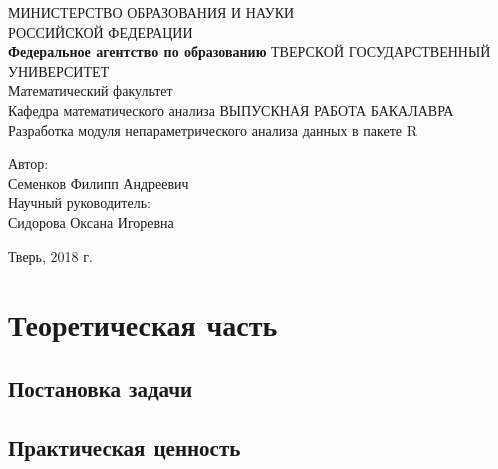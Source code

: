 \documentclass[14pt,a4paper]{scrartcl}
\begin{document}
    \begin{titlepage}
        \begin{center}
            \large
            МИНИСТЕРСТВО ОБРАЗОВАНИЯ И НАУКИ\\
            РОССИЙСКОЙ ФЕДЕРАЦИИ\\
            \textbf{Федеральное агентство по образованию}
            \vspace{0.5cm}
            ТВЕРСКОЙ ГОСУДАРСТВЕННЫЙ УНИВЕРСИТЕТ\\
            \vspace{0.25cm}
            Математический факультет\\
            Кафедра математического анализа
            \vfill
            \textsc{ВЫПУСКНАЯ РАБОТА БАКАЛАВРА}\\[5mm]
            {\LARGE Разработка модуля непараметрического анализа данных в пакете R\\[2mm]}
            \bigskip
        \end{center}
        \vfill
        \hfill
        \begin{minipage}{0.4\textwidth}
            Автор:\\
            Семенков Филипп Андреевич\\
            \newline
            Научный руководитель:\\
            Сидорова Оксана Игоревна\\
        \end{minipage}
        \vfill
        \begin{center}
            Тверь, 2018 г.
        \end{center}
    \end{titlepage}

    \newpage
    \tableofcontents

    \newpage
    \section[Теоретическая часть]{Теоретическая часть}
    \subsection[Постановка задачи]{Постановка задачи}
    \subsection[Актуальность]{Практическая ценность}
\end{document}
